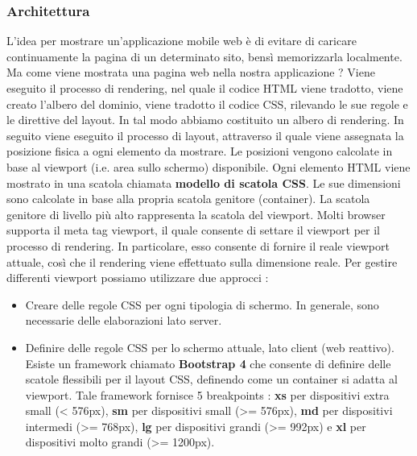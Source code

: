 \documentclass[12pt]{report}
\begin{document}
\subsubsection{Architettura}
L'idea per mostrare un'applicazione mobile web è di evitare di caricare continuamente la pagina di un determinato sito, bensì memorizzarla localmente. Ma come viene mostrata una pagina web nella nostra applicazione ? Viene eseguito il processo di rendering, nel quale il codice HTML viene tradotto, viene creato l'albero del dominio, viene tradotto il codice CSS, rilevando le sue regole e le direttive del layout. In tal modo abbiamo costituito un albero di rendering. In seguito viene eseguito il processo di layout, attraverso il quale viene assegnata la posizione fisica a ogni elemento da mostrare. Le posizioni vengono calcolate in base al viewport (i.e. area sullo schermo) disponibile. Ogni elemento HTML viene mostrato in una scatola chiamata \textbf{modello di scatola CSS}. Le sue dimensioni sono calcolate in base alla propria scatola genitore (container). La scatola genitore di livello più alto rappresenta la scatola del viewport. Molti browser supporta il meta tag viewport, il quale consente di settare il viewport per il processo di rendering. In particolare, esso consente di fornire il reale viewport attuale, così che il rendering viene effettuato sulla dimensione reale. Per gestire differenti viewport possiamo utilizzare due approcci :
\begin{itemize}
\item Creare delle regole CSS per ogni tipologia di schermo. In generale, sono necessarie delle elaborazioni lato server.
\item Definire delle regole CSS per lo schermo attuale, lato client (web reattivo). Esiste un framework chiamato \textbf{Bootstrap 4} che consente di definire delle scatole flessibili per il layout CSS, definendo come un container si adatta al viewport. Tale framework fornisce 5 breakpoints : \textbf{xs} per dispositivi extra small (< 576px), \textbf{sm} per dispositivi small (>= 576px), \textbf{md} per dispositivi intermedi (>= 768px), \textbf{lg} per dispositivi grandi (>= 992px) e \textbf{xl} per dispositivi molto grandi (>= 1200px).
\end{itemize}
\end{document}
